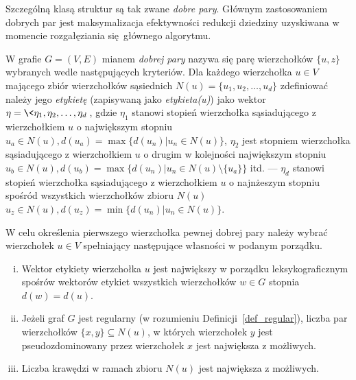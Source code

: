\par{
  Szczególną klasą struktur są tak zwane \emph{dobre pary}.
  Głównym zastosowaniem dobrych par jest maksymalizacja efektywności redukcji dziedziny uzyskiwana w momencie rozgałęziania się głównego algorytmu.
  \begin{definition}
    W grafie $G=(V, E)$ mianem \emph{dobrej pary} nazywa się parę wierzchołków $\{u, z\}$ wybranych wedle następujących kryteriów.
    Dla każdego wierzchołka $u \in V$ mającego zbiór wierzchołków sąsiednich $N(u)=\{u_1, u_2, \ldots, u_d\}$ zdefiniować należy jego \emph{etykietę} (zapisywaną jako \emph{etykieta(u)}) jako wektor $\eta=\<\eta_1, \eta_2, \ldots, \eta_d\>$, gdzie $\eta_1$ stanowi stopień wierzchołka sąsiadującego z wierzchołkiem $u$ o największym stopniu $u_{a} \in N(u), d(u_{a})=\max\{d(u_n) | u_n \in N(u)\}$, $\eta_2$ jest stopniem wierzchołka sąsiadującego z wierzchołkiem $u$ o drugim w kolejności największym stopniu $u_{b} \in N(u), d(u_{b})=\max\{d(u_n) | u_n \in N(u) \setminus \{u_{a}\}\}$ itd. --- $\eta_d$ stanowi stopień wierzchołka sąsiadującego z wierzchołkiem $u$ o najnżeszym stopniu spośród wszystkich wierzchołków zbioru $N(u)$ $u_{z} \in N(u), d(u_{z})=\min\{d(u_n) | u_n \in N(u)\}$.

    W celu określenia pierwszego wierzchołka pewnej dobrej pary należy wybrać wierzchołek $u \in V$ spełniający następujące własności w podanym porządku.
    \begin{enumerate}[(i)]
      \item Wektor etykiety wierzchołka $u$ jest największy w porządku leksykograficznym spośrów wektorów etykiet wszystkich wierzchołków $w \in G$ stopnia $d(w)=d(u)$.
      \item  Jeżeli graf $G$ jest regularny (w rozumieniu Definicji~\ref{def_regular}), liczba par wierzchołków $\{x, y\} \subseteq N(u)$, w których wierzchołek $y$ jest pseudozdominowany przez wierzchołek $x$ jest największa z możliwych.
      \item Liczba krawędzi w ramach zbioru $N(u)$ jest największa z możliwych.
    \end{enumerate}


\end{definition}}
